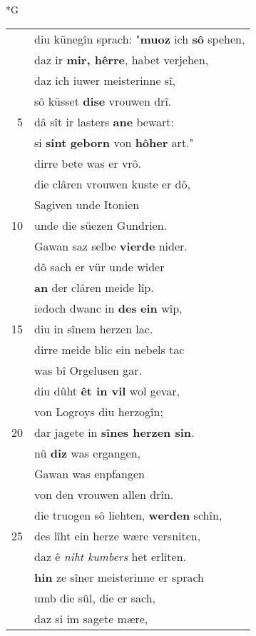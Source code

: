 \documentclass[8pt,a4paper,notitlepage]{article}
\begin{document}
\newpage
\begin{table}[ht]
\begin{minipage}[t]{0.5\linewidth}
\small
\begin{center}*G
\end{center}
\begin{tabular}{rl}
 & diu künegîn sprach: "\textbf{muoz} ich \textbf{sô} spehen,\\ 
 & daz ir \textbf{mir, hêrre}, habet verjehen,\\ 
 & daz ich iuwer meisterinne sî,\\ 
 & sô küsset \textbf{dise} vrouwen drî.\\ 
5 & dâ sît ir lasters \textbf{ane} bewart:\\ 
 & si \textbf{sint} \textbf{geborn} von \textbf{hôher} art."\\ 
 & dirre bete was er vrô.\\ 
 & die clâren vrouwen kuste er dô,\\ 
 & Sagiven unde Itonien\\ 
10 & unde die süezen Gundrien.\\ 
 & Gawan saz selbe \textbf{vierde} nider.\\ 
 & dô sach er vür unde wider\\ 
 & \textbf{an} der clâren meide lîp.\\ 
 & iedoch dwanc in \textbf{des} \textbf{ein} wîp,\\ 
15 & diu in sînem herzen lac.\\ 
 & dirre meide blic ein nebels tac\\ 
 & was bî Orgelusen gar.\\ 
 & diu dûht \textbf{êt in vil} wol gevar,\\ 
 & von Logroys diu herzogîn;\\ 
20 & dar jagete in \textbf{sînes herzen sin}.\\ 
 & nû \textbf{diz} was ergangen,\\ 
 & Gawan was enpfangen\\ 
 & von den vrouwen allen drîn.\\ 
 & die truogen sô liehten, \textbf{werden} schîn,\\ 
25 & des lîht ein herze wære versniten,\\ 
 & daz ê \textit{niht kumbers} het erliten.\\ 
 & \textbf{hin} ze sîner meisterinne er sprach\\ 
 & umb die sûl, die er sach,\\ 
 & daz si im sagete mære,\\ 

\end{tabular}
\end{minipage}
\end{table}
\end{document}
